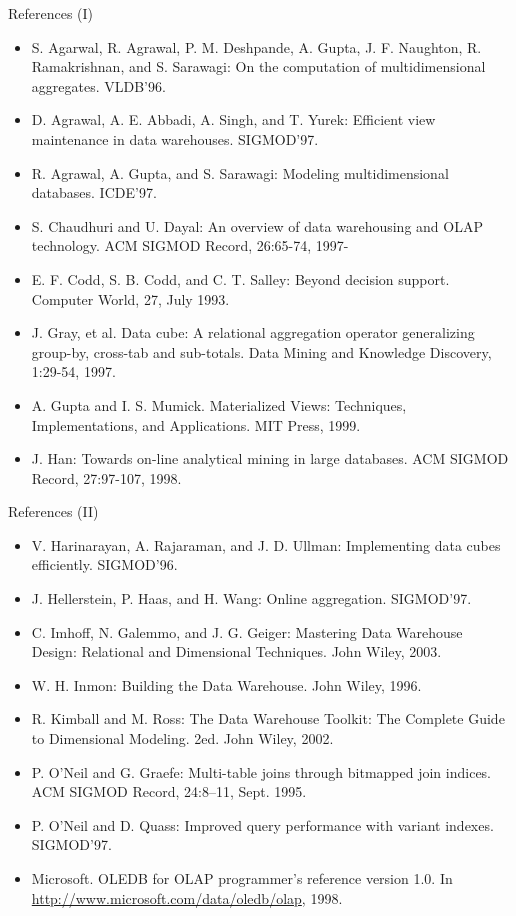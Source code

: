 \documentclass[aspectratio=169,t]{beamer}
\begin{document}
  {
    \begin{frame}{References (I)}
    \begin{itemize}
      \item S. Agarwal, R. Agrawal, P. M. Deshpande, A. Gupta, J. F. Naughton, R. Ramakrishnan, and S. Sarawagi: On the computation of multidimensional aggregates. VLDB'96.
      \item D. Agrawal, A. E. Abbadi, A. Singh, and T. Yurek: Efficient view maintenance in data warehouses. SIGMOD'97.
      \item R. Agrawal, A. Gupta, and S. Sarawagi: Modeling multidimensional databases.  ICDE'97.
      \item {\color{airforceblue}S. Chaudhuri and U. Dayal: An overview of data warehousing and OLAP technology. ACM SIGMOD Record, 26:65-74, 1997-}
      \item E. F. Codd, S. B. Codd, and C. T. Salley: Beyond decision support. Computer World, 27, July 1993.
      \item J. Gray, et al. Data cube: A relational aggregation operator generalizing group-by, cross-tab and sub-totals. Data Mining and Knowledge Discovery, 1:29-54, 1997.
      \item A. Gupta and I. S. Mumick.  Materialized Views: Techniques, Implementations, and Applications. MIT Press, 1999.
      \item J. Han:  Towards on-line analytical mining in large databases. ACM SIGMOD Record, 27:97-107, 1998.
    \end{itemize}
    \end{frame}
  }

  {
    \begin{frame}{References (II)}
    \begin{itemize}
      \item V. Harinarayan, A. Rajaraman, and J. D. Ullman: Implementing data cubes efficiently. SIGMOD'96.
      \item J. Hellerstein, P. Haas, and H. Wang: Online aggregation. SIGMOD'97.
      \item C. Imhoff, N. Galemmo, and J. G. Geiger: Mastering Data Warehouse Design: Relational and Dimensional Techniques. John Wiley, 2003.
      \item W. H. Inmon: Building the Data Warehouse. John Wiley, 1996.
      \item R. Kimball and M. Ross: The Data Warehouse Toolkit: The Complete Guide to Dimensional Modeling. 2ed. John Wiley, 2002.
      \item P. O’Neil and G. Graefe: Multi-table joins through bitmapped join indices. ACM SIGMOD Record, 24:8–11, Sept. 1995.
      \item P. O'Neil and D. Quass: Improved query performance with variant indexes. SIGMOD'97.
      \item Microsoft. OLEDB for OLAP programmer's reference version 1.0. In \href{http://www.microsoft.com/data/oledb/olap}{http://www.microsoft.com/data/oledb/olap}, 1998.
    \end{itemize}
    \end{frame}
  }
\end{document}
